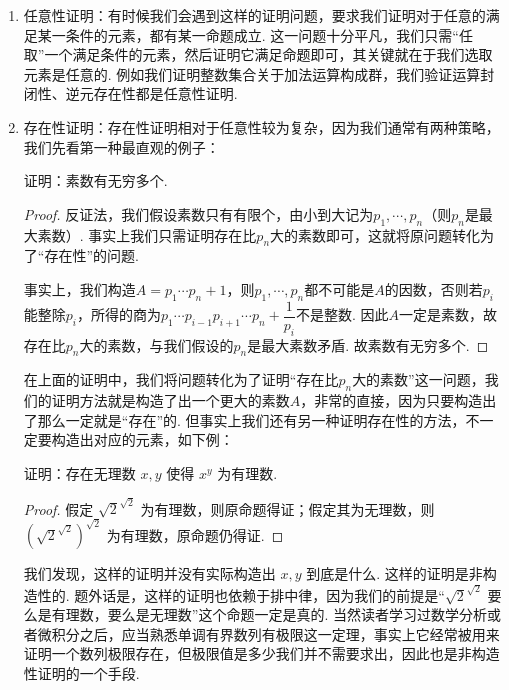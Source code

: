 \begin{enumerate}
    \item 任意性证明：有时候我们会遇到这样的证明问题，要求我们证明对于任意的满足某一条件的元素，都有某一命题成立. 这一问题十分平凡，我们只需``任取''一个满足条件的元素，然后证明它满足命题即可，其关键就在于我们选取元素是任意的. 例如我们证明整数集合关于加法运算构成群，我们验证运算封闭性、逆元存在性都是任意性证明.

    \item 存在性证明：存在性证明相对于任意性较为复杂，因为我们通常有两种策略，我们先看第一种最直观的例子：
          \begin{example}
              证明：素数有无穷多个.
          \end{example}
          \begin{proof}
              反证法，我们假设素数只有有限个，由小到大记为$p_1,\cdots,p_n$（则$p_n$是最大素数）. 事实上我们只需证明存在比$p_n$大的素数即可，这就将原问题转化为了``存在性''的问题.

              事实上，我们构造$A=p_1\cdots p_n+1$，则$p_1,\cdots,p_n$都不可能是$A$的因数，否则若$p_i$能整除$p_i$，所得的商为$p_1\cdots p_{i-1}p_{i+1}\cdots p_n+\dfrac{1}{p_i}$不是整数. 因此$A$一定是素数，故存在比$p_n$大的素数，与我们假设的$p_n$是最大素数矛盾. 故素数有无穷多个.
          \end{proof}

          在上面的证明中，我们将问题转化为了证明``存在比$p_n$大的素数''这一问题，我们的证明方法就是构造了出一个更大的素数$A$，非常的直接，因为只要构造出了那么一定就是``存在''的. 但事实上我们还有另一种证明存在性的方法，不一定要构造出对应的元素，如下例：
          \begin{example*}
              证明：存在无理数 $x, y$ 使得 $x^y$ 为有理数.
          \end{example*}
          \begin{proof}
              假定 $\sqrt{2}^{\sqrt{2}}$ 为有理数，则原命题得证；假定其为无理数，则 $\left(\sqrt{2}^{\sqrt{2}}\right)^{\sqrt{2}}$ 为有理数，原命题仍得证.
          \end{proof}


          我们发现，这样的证明并没有实际构造出 $x, y$ 到底是什么. 这样的证明是非构造性的. 题外话是，这样的证明也依赖于排中律，因为我们的前提是``$\sqrt{2}^{\sqrt{2}}$ 要么是有理数，要么是无理数''这个命题一定是真的. 当然读者学习过数学分析或者微积分之后，应当熟悉单调有界数列有极限这一定理，事实上它经常被用来证明一个数列极限存在，但极限值是多少我们并不需要求出，因此也是非构造性证明的一个手段.


\end{enumerate}
